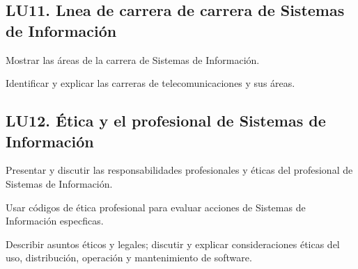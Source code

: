 \subsection{LU11. L­nea de carrera de carrera de Sistemas de Información}\label{sec:LU11}
\begin{LearningUnit}
\begin{LUGoal}
\item Mostrar las áreas de la carrera de Sistemas de Información.
\end{LUGoal}

\begin{LUObjective}
\item Identificar y explicar las carreras de telecomunicaciones y sus áreas.
\end{LUObjective}
\end{LearningUnit}

\subsection{LU12. Ética y el profesional de Sistemas de Información}\label{sec:LU12}
\begin{LearningUnit}
\begin{LUGoal}
\item Presentar y discutir las responsabilidades profesionales y éticas del profesional de Sistemas de Información.
\end{LUGoal}

\begin{LUObjective}
\item Usar códigos de ética profesional para evaluar acciones de Sistemas de Información espec­ficas.
\item Describir asuntos éticos y legales; discutir y explicar consideraciones éticas del uso, distribución, operación y mantenimiento de software.
\end{LUObjective}
\end{LearningUnit}

